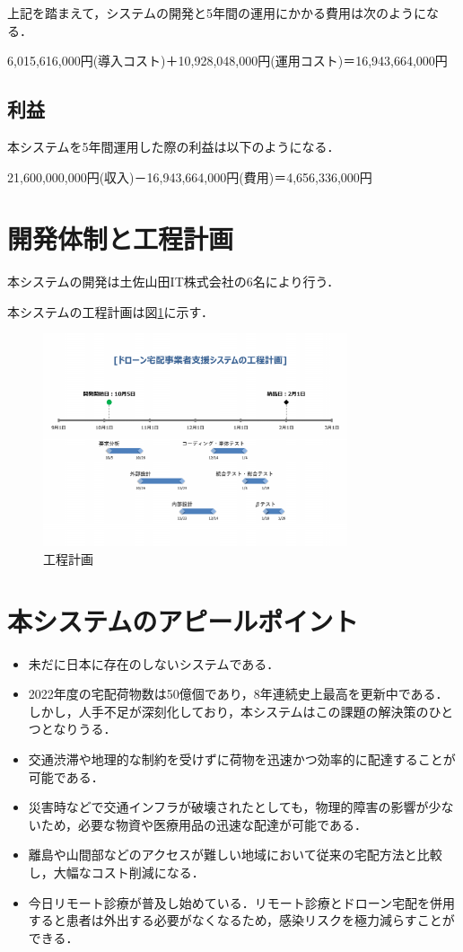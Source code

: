 \documentclass[a4paper, titlepage]{jsarticle}
\begin{document}
上記を踏まえて，システムの開発と5年間の運用にかかる費用は次のようになる．
\begin{center}
  6,015,616,000円(導入コスト)＋10,928,048,000円(運用コスト)＝16,943,664,000円
\end{center}

\subsection{利益}
本システムを5年間運用した際の利益は以下のようになる．
\begin{center}
  21,600,000,000円(収入)－16,943,664,000円(費用)＝4,656,336,000円
\end{center}

\section{開発体制と工程計画}
本システムの開発は土佐山田IT株式会社の6名により行う．

本システムの工程計画は図\ref{fig:schedule}に示す．
\begin{figure}[H]
  \centering
  \includegraphics[width=0.8\textwidth]{schedule.pdf}
  \caption{工程計画}
  \label{fig:schedule}
\end{figure}

\section{本システムのアピールポイント}
\begin{itemize}
  \item 未だに日本に存在のしないシステムである．
  \item 2022年度の宅配荷物数は50億個であり，8年連続史上最高を更新中である．しかし，人手不足が深刻化しており，本システムはこの課題の解決策のひとつとなりうる．
  \item 交通渋滞や地理的な制約を受けずに荷物を迅速かつ効率的に配達することが可能である．
  \item 災害時などで交通インフラが破壊されたとしても，物理的障害の影響が少ないため，必要な物資や医療用品の迅速な配達が可能である．
  \item 離島や山間部などのアクセスが難しい地域において従来の宅配方法と比較し，大幅なコスト削減になる．
  \item 今日リモート診療が普及し始めている．リモート診療とドローン宅配を併用すると患者は外出する必要がなくなるため，感染リスクを極力減らすことができる．
\end{itemize}
\end{document}
